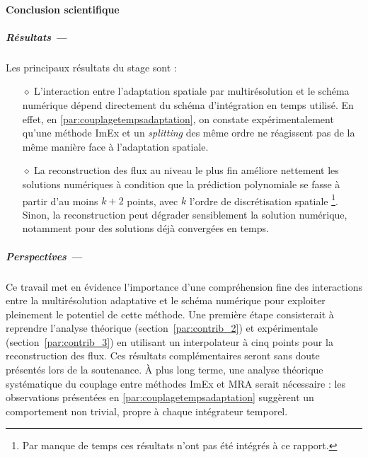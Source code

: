 \label{par:cc}
\paragraph*{Conclusion scientifique}\label{par:cc1}
\subparagraph*{Résultats —}  
Les principaux résultats du stage sont : 
\begin{itemize}
    \item[$\diamond$] L'interaction entre l'adaptation spatiale par multirésolution et le schéma numérique dépend directement du schéma d'intégration en temps utilisé.
    En effet, en \ref{par:couplagetempsadaptation}, on constate expérimentalement qu'une méthode ImEx et un \emph{splitting} des même ordre ne réagissent pas de la même manière face à l'adaptation spatiale.
    
    \item[$\diamond$] La reconstruction des flux au niveau le plus fin améliore nettement les solutions numériques à condition que la prédiction polynomiale 
    se fasse à partir d'au moins \(k+2\) points, avec \(k\) l'ordre de discrétisation spatiale \footnote{Par manque de temps ces résultats n'ont pas été intégrés à ce rapport.}.
    Sinon, la reconstruction peut dégrader sensiblement la solution numérique, notamment pour des solutions déjà convergées en temps.
\end{itemize}

\medskip
\subparagraph*{Perspectives —}  
Ce travail met en évidence l'importance d'une compréhension fine des interactions entre la multirésolution adaptative et le schéma numérique pour exploiter pleinement le potentiel de cette méthode.  
Une première étape consisterait à reprendre l'analyse théorique (section~\ref{par:contrib_2}) et expérimentale (section~\ref{par:contrib_3}) en utilisant un interpolateur à cinq points pour la reconstruction des flux.  
Ces résultats complémentaires seront sans doute présentés lors de la soutenance.  
À plus long terme, une analyse théorique systématique du couplage entre méthodes ImEx et MRA serait nécessaire : les observations présentées en \ref{par:couplagetempsadaptation} suggèrent un comportement non trivial, propre à chaque intégrateur temporel.

